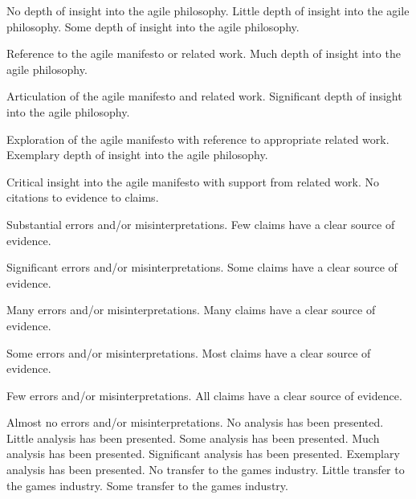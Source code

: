 \documentclass{../fal_assignment}
\begin{document}
\begin{markingrubric}
        \grade\fail 	No depth of insight into the agile philosophy.
        \grade 		Little depth of insight into the agile philosophy.
        \grade 		Some depth of insight into the agile philosophy.
        \par 		Reference to the agile manifesto or related work.
        \grade 		Much depth of insight into the agile philosophy.
        \par 		Articulation of the agile manifesto and related work.
        \grade 		Significant depth of insight into the agile philosophy.
        \par 		Exploration of the agile manifesto with reference to appropriate related work.
        \grade 		Exemplary depth of insight into the agile philosophy.
        \par 		Critical insight into the agile manifesto with support from related work.
%
        \grade\fail 	No citations to evidence to claims.
        \par 		Substantial errors and/or misinterpretations.
        \grade 		Few claims have a clear source of evidence.
        \par 		Significant errors and/or misinterpretations.
        \grade 		Some claims have a clear source of evidence.
        \par 		Many errors and/or misinterpretations.
        \grade 		Many claims have a clear source of evidence.
        \par 		Some errors and/or misinterpretations.
        \grade 		Most claims have a clear source of evidence.
        \par 		Few errors and/or misinterpretations.
        \grade 		All claims have a clear source of evidence.
        \par 		Almost no errors and/or misinterpretations.
%
        \grade\fail 	No analysis has been presented.
        \grade 		Little analysis has been presented.
        \grade 		Some analysis has been presented. 
        \grade 		Much analysis has been presented.
        \grade 		Significant analysis has been presented.
        \grade 		Exemplary analysis has been presented.
%
        \grade\fail 	No transfer to the games industry.
        \grade 		Little transfer to the games industry.
        \grade 		Some transfer to the games industry. 

\end{markingrubric}
\end{document}
